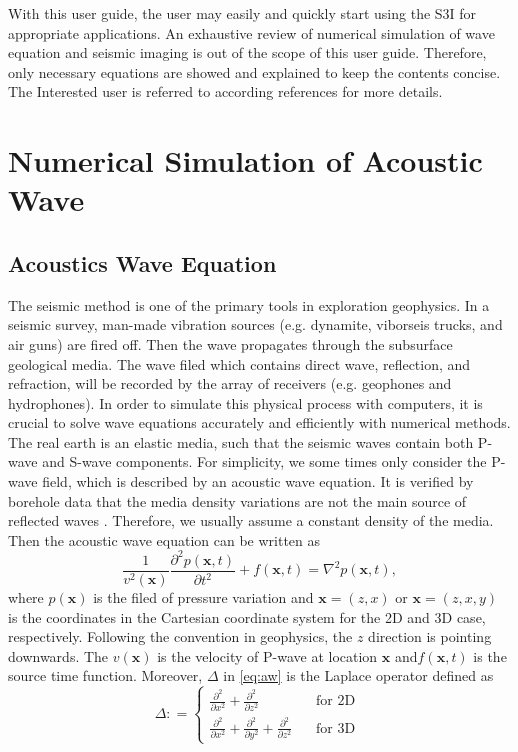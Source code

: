\documentclass[11pt,titlepage]{article}
\newcommand{\bx}{\boldsymbol{x}}
\theoremstyle{plain}
\theoremstyle{definition}
\theoremstyle{remark}
\numberwithin{equation}{section}
\begin{document}
With this user guide, the user may easily and quickly start using the S3I for appropriate applications. An exhaustive review of numerical simulation of wave equation and seismic imaging is out of the scope of this user guide. Therefore, only necessary equations are showed and explained to keep the contents concise. The Interested user is referred to according references for more details.  

\section{Numerical Simulation of Acoustic Wave}

\subsection{Acoustics Wave Equation}
The seismic method is one of the primary tools in exploration geophysics. In a seismic survey, man-made vibration sources (e.g. dynamite, viborseis trucks, and air guns) are fired off. Then the wave propagates through the subsurface geological media. The wave filed which contains direct wave, reflection, and refraction, will be recorded by the array of receivers (e.g. geophones and hydrophones). In order to simulate this physical process with computers, it is crucial to solve wave equations accurately and efficiently with numerical methods. The real earth is an elastic media, such that the seismic waves contain both P-wave and S-wave components. For simplicity, we some times only consider the P-wave field, which is described by an acoustic wave equation. It is verified by borehole data that the media density variations are not the main source of reflected waves \cite{Hood:1981aa}. Therefore, we usually assume a constant density of the media. Then the acoustic wave equation can be written as
\begin{equation}\label{eq:aw}
\frac{1}{v^2(\bx)}\frac{\partial^2 p(\bx, t)}{\partial t^2} + f(\bx, t) = \nabla^2 p(\bx, t),
\end{equation}
where $p(\bx)$ is the filed of pressure variation and $\bx=(z,x)$ or $\bx=(z,x,y)$ is the coordinates in the Cartesian coordinate system for the 2D and 3D case, respectively. Following the convention in geophysics, the $z$ direction is pointing downwards. The $v(\bx)$ is the velocity of P-wave at location $\bx$ and$f(\bx,t)$ is the source time function. Moreover, $\Delta$ in \eqref{eq:aw} is the Laplace operator defined as 
\begin{equation}
\Delta: =\left\{
\begin{aligned}
\frac{\partial^2}{\partial x^2}+\frac{\partial^2}{\partial z^2}~~~~~~~ & ~~~~\text{for 2D }\\
\frac{\partial^2}{\partial x^2}+\frac{\partial^2}{\partial y^2}+\frac{\partial^2}{\partial z^2} &~~~~ \text{for 3D}
\end{aligned}
\right.  
\end{equation}
\end{document}
